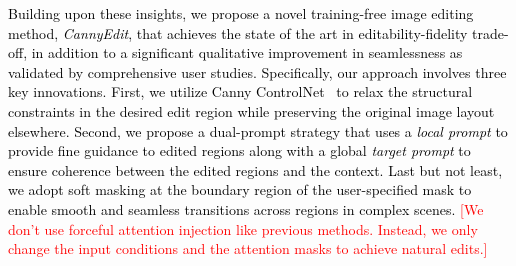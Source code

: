 \documentclass{article}
\newcommand{\kcc}[1]{\textcolor{black}{#1}}
\begin{document}







\kcc{Building upon these insights, we propose a novel training-free image editing method, \emph{CannyEdit}, that achieves the state of the art in editability-fidelity trade-off, in addition to a significant qualitative improvement in seamlessness as validated by comprehensive user studies.
Specifically, our approach involves three key innovations.
First, we utilize Canny ControlNet~\citep{zhang2023adding} to relax the structural constraints in the desired edit region while preserving the original image layout elsewhere.
Second, we propose a dual-prompt strategy that uses a \emph{local prompt} to provide fine guidance to edited regions along with a global \emph{target prompt} to ensure coherence between the edited regions and the context.
Last but not least, we adopt soft masking at the boundary region of the user-specified mask to enable smooth and seamless transitions across regions in complex scenes. \textcolor{red}{[We don't use forceful attention injection like previous methods. Instead, we only change the input conditions and the attention masks to achieve natural edits.]}}
\end{document}
